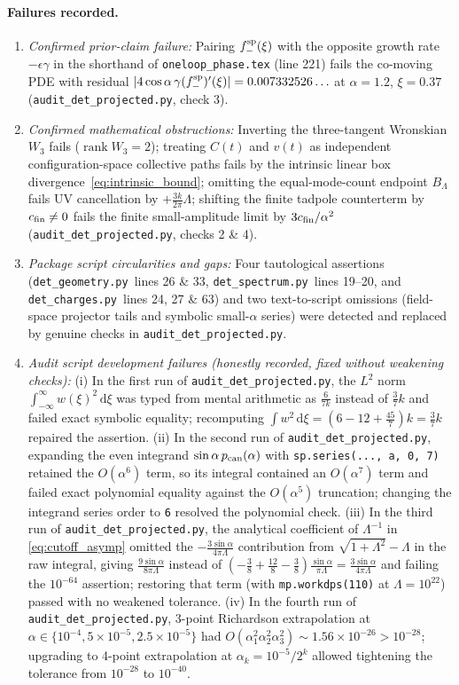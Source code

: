 \documentclass[11pt,a4paper]{article}
\newcommand{\scr}{\texttt{audit\_\allowbreak det\_\allowbreak projected.py}}
\newcommand{\G}{\texttt{det\_\allowbreak geometry.py}}
\newcommand{\Scheck}{\texttt{det\_\allowbreak spectrum.py}}
\newcommand{\Ccheck}{\texttt{det\_\allowbreak charges.py}}
\newcommand{\dd}{\mathrm d}
\begin{document}
\paragraph{Failures recorded.}
\begin{enumerate}
\item \emph{Confirmed prior-claim failure:} Pairing $f_-^{\rm sp}(\xi)$ with the
opposite growth rate $-\epsilon\gamma$ in the shorthand of
\texttt{oneloop\_\allowbreak phase.tex} (line 221) fails the co-moving PDE with
residual $|4\cos\alpha\,\gamma(f_-^{\rm sp})'(\xi)|=0.007332526\ldots$ at
$\alpha=1.2$, $\xi=0.37$ (\scr, check 3).
\item \emph{Confirmed mathematical obstructions:} Inverting the three-tangent
Wronskian $W_3$ fails ($\operatorname{rank}W_3=2$); treating $C(t)$ and $v(t)$
as independent configuration-space collective paths fails by the intrinsic linear
box divergence~\eqref{eq:intrinsic_bound}; omitting the equal-mode-count endpoint
$B_\Lambda$ fails UV cancellation by $+\frac{3k}{2\pi}\Lambda$; shifting the
finite tadpole counterterm by $c_{\rm fin}\ne0$ fails the finite small-amplitude
limit by $3c_{\rm fin}/\alpha^2$ (\scr, checks 2 \& 4).
\item \emph{Package script circularities and gaps:} Four tautological assertions
(\G\ lines 26 \& 33, \Scheck\ lines 19--20, and \Ccheck\ lines 24, 27 \& 63) and
two text-to-script omissions (field-space projector tails and symbolic
small-$\alpha$ series) were detected and replaced by genuine checks in \scr.
\item \emph{Audit script development failures (honestly recorded, fixed without
weakening checks):}
(i) In the first run of \scr, the $L^2$ norm $\int_{-\infty}^\infty w(\xi)^2\,\dd\xi$
was typed from mental arithmetic as $\frac{6}{7k}$ instead of $\frac37k$ and failed
exact symbolic equality; recomputing $\int w^2\,\dd\xi=(6-12+\frac{45}{7})k=\frac37k$
repaired the assertion.
(ii) In the second run of \scr, expanding the even integrand
$\sin\alpha\,p_{\rm can}(\alpha)$ with \texttt{sp.series(..., a, 0, 7)} retained
the $O(\alpha^6)$ term, so its integral contained an $O(\alpha^7)$ term and
failed exact polynomial equality against the $O(\alpha^5)$ truncation; changing
the integrand series order to \texttt{6} resolved the polynomial check.
(iii) In the third run of \scr, the analytical coefficient of $\Lambda^{-1}$ in
\eqref{eq:cutoff_asymp} omitted the $-\frac{3\sin\alpha}{4\pi\Lambda}$ contribution
from $\sqrt{1+\Lambda^2}-\Lambda$ in the raw integral, giving $\frac{9\sin\alpha}{8\pi\Lambda}$
instead of $(-\frac38+\frac{12}{8}-\frac38)\frac{\sin\alpha}{\pi\Lambda}=\frac{3\sin\alpha}{4\pi\Lambda}$
and failing the $10^{-64}$ assertion; restoring that term (with \texttt{mp.workdps(110)}
at $\Lambda=10^{22}$) passed with no weakened tolerance.
(iv) In the fourth run of \scr, 3-point Richardson extrapolation at
$\alpha\in\{10^{-4},5\times10^{-5},2.5\times10^{-5}\}$ had $O(\alpha_1^2\alpha_2^2\alpha_3^2)\sim1.56\times10^{-26}>10^{-28}$;
upgrading to 4-point extrapolation at $\alpha_k=10^{-5}/2^k$ allowed tightening
the tolerance from $10^{-28}$ to $10^{-40}$.
\end{enumerate}
\end{document}
